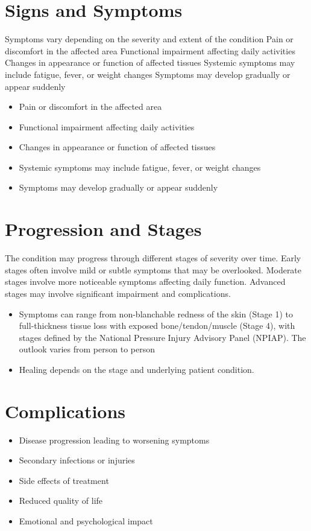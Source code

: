 \section{Signs and Symptoms}
Symptoms vary depending on the severity and extent of the condition Pain or discomfort in the affected area Functional impairment affecting daily activities Changes in appearance or function of affected tissues Systemic symptoms may include fatigue, fever, or weight changes Symptoms may develop gradually or appear suddenly

\begin{itemize}[noitemsep]
  \item Pain or discomfort in the affected area
  \item Functional impairment affecting daily activities
  \item Changes in appearance or function of affected tissues
  \item Systemic symptoms may include fatigue, fever, or weight changes
  \item Symptoms may develop gradually or appear suddenly
\end{itemize}
\section{Progression and Stages}
The condition may progress through different stages of severity over time. Early stages often involve mild or subtle symptoms that may be overlooked. Moderate stages involve more noticeable symptoms affecting daily function. Advanced stages may involve significant impairment and complications.

\begin{itemize}[noitemsep]
  \item Symptoms can range from non-blanchable redness of the skin (Stage 1) to full-thickness tissue loss with exposed bone/tendon/muscle (Stage 4), with stages defined by the National Pressure Injury Advisory Panel (NPIAP). The outlook varies from person to person
  \item Healing depends on the stage and underlying patient condition.
\end{itemize}
\section{Complications}
\begin{itemize}[noitemsep]
  \item Disease progression leading to worsening symptoms
  \item Secondary infections or injuries
  \item Side effects of treatment
  \item Reduced quality of life
  \item Emotional and psychological impact
\end{itemize}
